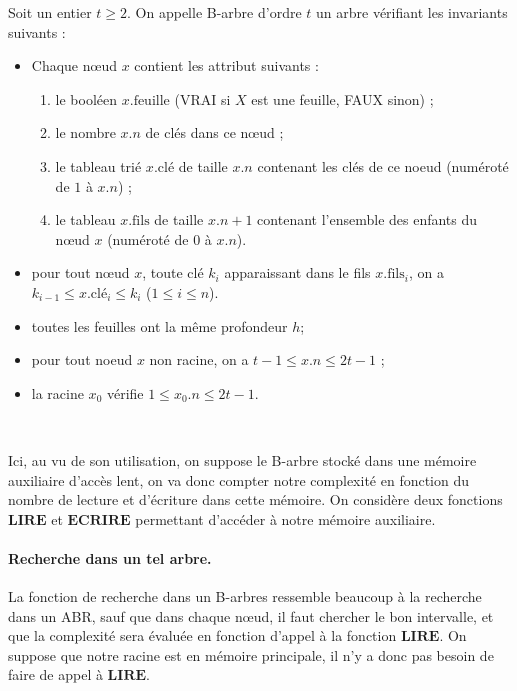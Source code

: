 \begin{definition}[B-arbre]

Soit un entier $t\geq 2$. On appelle B-arbre d'ordre $t$ un arbre vérifiant les invariants suivants :
\begin{itemize}
\item Chaque nœud $x$ contient les attribut suivants :
\begin{enumerate}
\item le booléen $x.\text{feuille}$ (VRAI si $X$ est une feuille, FAUX sinon) ;
\item le nombre $x.n$ de clés dans ce nœud  ;
\item le tableau trié $x.\text{clé}$ de taille $x.n$ contenant les clés de ce noeud (numéroté de $1$ à $x.n$) ;
\item le tableau $x.\text{fils}$ de taille $x.n +1$ contenant l'ensemble des enfants du nœud $x$ (numéroté de $0$ à $x.n$).
\end{enumerate}
\item pour tout nœud $x$, toute clé $k_i$ apparaissant dans le fils $x.\text{fils}_i$, on a $k_{i-1} \leq x.\text{clé}_i \leq k_i$ ($1\leq i \leq n$).
\item toutes les feuilles ont la même profondeur $h$;
\item pour tout noeud $x$ non racine, on a $t-1 \leq x.n \leq 2t-1$ ;
\item la racine $x_0$ vérifie $1\leq x_0.n \leq 2t-1$.
\end{itemize}
\end{definition}~\newline

Ici, au vu de son utilisation, on suppose le B-arbre stocké dans une mémoire auxiliaire d'accès lent, on va donc compter notre complexité en fonction du nombre de lecture et d'écriture dans cette mémoire. On considère deux fonctions $\mathbf{LIRE}$ et $\mathbf{ECRIRE}$ permettant d'accéder à notre mémoire auxiliaire.



\paragraph{Recherche dans un tel arbre.}
La fonction de recherche dans un B-arbres ressemble beaucoup à la recherche dans un ABR, sauf que dans chaque nœud, il faut chercher le bon intervalle, et que la complexité sera évaluée en fonction d'appel à la fonction $\mathbf{LIRE}$. On suppose que notre racine est en mémoire principale, il n'y a donc pas besoin de faire de appel à $\mathbf{LIRE}$. 

